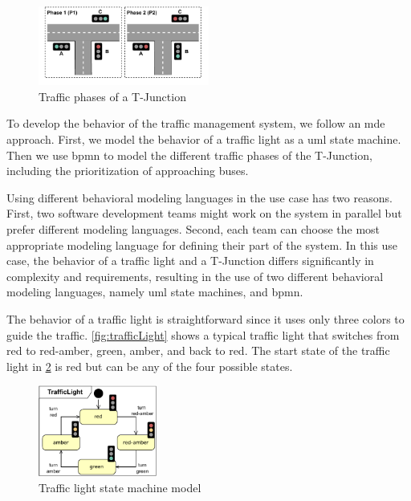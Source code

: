\documentclass{jot}
\begin{document}
\begin{figure}[h]
    \centering
    \includegraphics[width=0.5\textwidth]{figures/phases.pdf}
    \caption{Traffic phases of a T-Junction}
    \label{fig:junction-phases}
\end{figure}

To develop the behavior of the traffic management system, we follow an \gls*{mde} approach.
First, we model the behavior of a traffic light as a \gls*{uml} state machine.
Then we use \gls*{bpmn} to model the different traffic phases of the T-Junction, including the prioritization of approaching buses.

Using different behavioral modeling languages in the use case has two reasons.
First, two software development teams might work on the system in parallel but prefer different modeling languages.
Second, each team can choose the most appropriate modeling language for defining their part of the system.
In this use case, the behavior of a traffic light and a T-Junction differs significantly in complexity and requirements, resulting in the use of two different behavioral modeling languages, namely \gls*{uml} state machines, and \gls*{bpmn}.

The behavior of a traffic light is straightforward since it uses only three colors to guide the traffic.
\autoref{fig:trafficLight} shows a typical traffic light that switches from \textsf{red} to \textsf{red-amber}, \textsf{green}, \textsf{amber}, and back to \textsf{red}.
The start state of the traffic light in \cref{fig:trafficLight} is \textsf{red} but can be any of the four possible states.

\begin{figure}[h]
    \centering
    \includegraphics[width=0.35\textwidth]{figures/trafficLight.pdf}
    \caption{Traffic light state machine model}
    \label{fig:trafficLight}
\end{figure}
\end{document}
